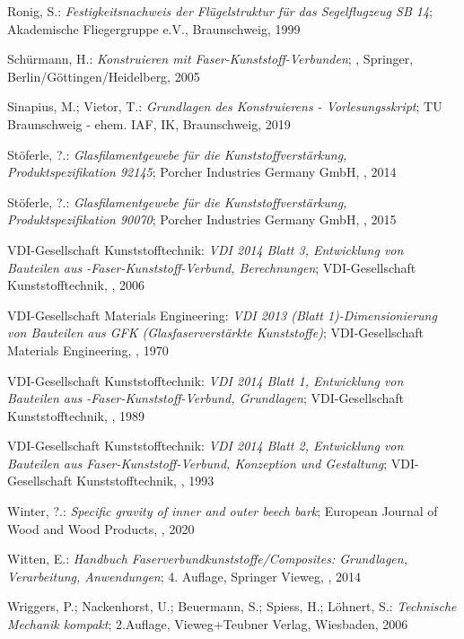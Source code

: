 \begin{thebibliography}{99}
	Ronig, S.:
	\textit{\glqq Festigkeitsnachweis der Flügelstruktur für das Segelflugzeug SB 14\grqq};
	Akademische Fliegergruppe e.V., Braunschweig, 1999 
	
	Schürmann, H.:
	\textit{\glqq Konstruieren mit Faser-Kunststoff-Verbunden\grqq};
	, Springer, Berlin/Göttingen/Heidelberg, 2005 
	
	Sinapius, M.; Vietor, T.:
	\textit{\glqq Grundlagen des Konstruierens - Vorlesungsskript\grqq};
	TU Braunschweig - ehem. IAF, IK, Braunschweig, 2019
	
	Stöferle, ?.:
	\textit{\glqq Glasfilamentgewebe für die Kunststoffverstärkung, Produktspezifikation 92145\grqq};
	Porcher Industries Germany GmbH, , 2014
	
	Stöferle, ?.:
	\textit{\glqq Glasfilamentgewebe für die Kunststoffverstärkung, Produktspezifikation 90070\grqq};
	Porcher Industries Germany GmbH, , 2015
	
	VDI-Gesellschaft Kunststofftechnik:
	\textit{\glqq VDI 2014 Blatt 3, Entwicklung von Bauteilen aus -Faser-Kunststoff-Verbund, Berechnungen\grqq};
	VDI-Gesellschaft Kunststofftechnik, , 2006
	
	VDI-Gesellschaft Materials Engineering:
	\textit{\glqq VDI 2013 (Blatt 1)-Dimensionierung von Bauteilen aus GFK (Glasfaserverstärkte Kunststoffe)\grqq};
	VDI-Gesellschaft Materials Engineering, , 1970
	
	VDI-Gesellschaft Kunststofftechnik:
	\textit{\glqq VDI 2014 Blatt 1, Entwicklung von Bauteilen aus -Faser-Kunststoff-Verbund, Grundlagen\grqq};
	VDI-Gesellschaft Kunststofftechnik, , 1989

	VDI-Gesellschaft Kunststofftechnik:
	\textit{\glqq VDI 2014 Blatt 2, Entwicklung von Bauteilen aus Faser-Kunststoff-Verbund, Konzeption und Gestaltung\grqq};
	VDI-Gesellschaft Kunststofftechnik, , 1993 
	
	Winter, ?.:
	\textit{\glqq Specific gravity of inner and outer beech bark\grqq};
	European Journal of Wood and Wood Products, , 2020
	
	Witten, E.:
	\textit{\glqq Handbuch Faserverbundkunststoffe/Composites: Grundlagen, Verarbeitung, Anwendungen\grqq};
	4. Auflage, Springer Vieweg, , 2014 
	
	Wriggers, P.; Nackenhorst, U.; Beuermann, S.; Spiess, H.; Löhnert, S.:
	\textit{\glqq Technische Mechanik kompakt\grqq};
	2.Auflage, Vieweg+Teubner Verlag, Wiesbaden, 2006
	
\end{thebibliography}
\endgroup